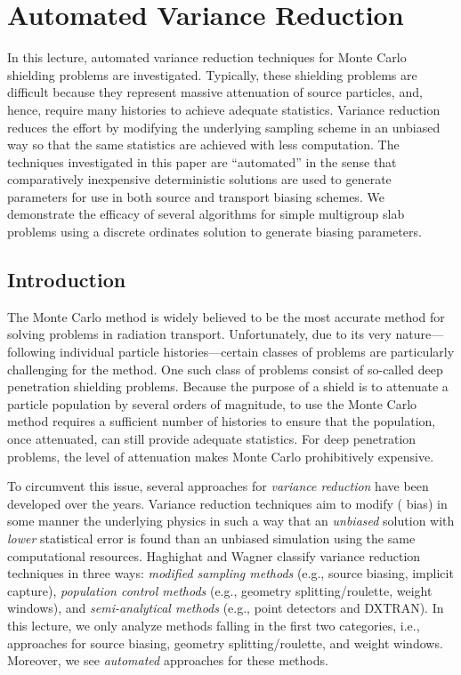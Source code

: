 \chapter{Automated Variance Reduction}

In this lecture, automated variance reduction techniques 
for Monte Carlo shielding problems are investigated. 
Typically, these shielding problems 
are difficult because they represent massive attenuation of source 
particles, and, hence, require many histories to achieve adequate statistics.  
Variance reduction reduces the effort by modifying the underlying sampling 
scheme in an unbiased way so that  the same statistics are achieved with 
less computation.  The techniques investigated in this paper 
are ``automated'' in the sense that comparatively inexpensive deterministic 
solutions are used to generate parameters for use in both source and 
transport biasing schemes.  We demonstrate the efficacy of several 
algorithms for simple multigroup slab problems using a discrete ordinates 
solution to generate biasing parameters.

\section{Introduction}

The Monte Carlo method is widely believed to be the most accurate method 
for solving problems in radiation transport.  Unfortunately, due to its 
very nature---following individual particle histories---certain classes 
of problems are particularly challenging for the method.  One such class 
of problems consist of so-called deep penetration shielding problems.  
Because the purpose of a shield is to attenuate a particle population by 
several orders of magnitude, to use the Monte Carlo method requires a 
sufficient number of histories to ensure that the population, once attenuated, 
can still provide adequate statistics.  For deep penetration problems, the 
level of attenuation makes Monte Carlo prohibitively expensive.

To circumvent this issue, several approaches for \emph{variance reduction} have
been developed over the years.  Variance reduction techniques aim to modify (\ie
bias) in some manner the underlying physics in such a way that an \emph{unbiased}
solution with \emph{lower} statistical error is found than an unbiased simulation
using the same computational resources.  Haghighat and Wagner
\cite{haghighat2003mcv} classify variance reduction techniques in three ways:
\emph{modified sampling methods} (e.g., source biasing, implicit capture), 
\emph{population control methods} (e.g., geometry splitting/roulette, weight windows),
and 
\emph{semi-analytical methods} (e.g., point detectors and DXTRAN).  
In this lecture, we only analyze methods falling in the first two 
categories, i.e.,
approaches for source biasing, geometry splitting/roulette, and
weight windows.  Moreover, we see \emph{automated} approaches 
for these methods.  

